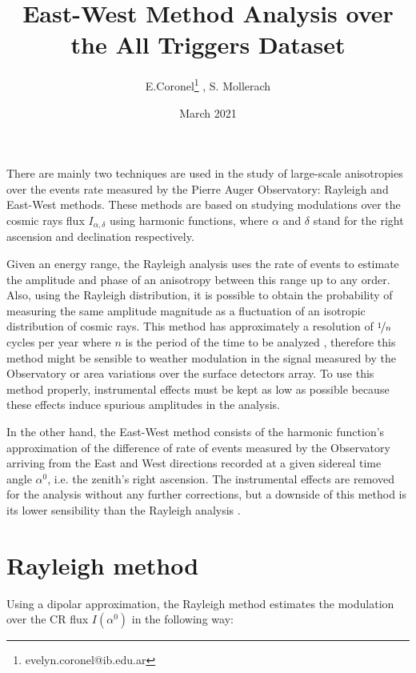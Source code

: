 \documentclass[12pt, doublespace, oneside]{article}
\title{{\vspace{-1.6cm}}East-West Method Analysis over the All Triggers Dataset}
\author{E.Coronel\footnote{evelyn.coronel@ib.edu.ar} ,  S. Mollerach}
\date{March 2021}
\begin{document}
\begin{titlepage}
\maketitle
\end{titlepage}


There are mainly two techniques are used in the study of large-scale anisotropies over the events rate measured by the Pierre Auger Observatory: Rayleigh and East-West methods. These methods are based on studying modulations over the cosmic rays flux $I_{\alpha, \delta}$ using harmonic functions, where $\alpha$ and $\delta$ stand for the right ascension and declination respectively. 

Given an energy range, the Rayleigh analysis uses the rate of events to estimate the amplitude and phase of an anisotropy between this range up to any order. Also, using the Rayleigh distribution, it is possible to obtain the probability of measuring the same amplitude magnitude as a fluctuation of an isotropic distribution of cosmic rays. This method has approximately a resolution of $\nicefrac{1}{n}$ cycles per year where $n$ is the period of the time to be analyzed \cite{resolucion_barrido}, therefore this method might be sensible to weather modulation in the signal measured by the Observatory or area variations over the surface detectors array. To use this method properly,  instrumental effects must be kept as low as possible because these effects induce spurious amplitudes in the analysis.


In the other hand, the East-West method consists of the harmonic function's approximation of the difference of rate of events measured by the Observatory arriving from the East and West directions recorded at a given sidereal time angle $\alpha^0$, i.e. the zenith's right ascension. The instrumental effects are removed for the analysis without any further corrections, but a downside of this method is its lower sensibility than the Rayleigh analysis \cite{taborda}.

\section{Rayleigh method}

Using a dipolar approximation, the Rayleigh method estimates the modulation over the CR flux $I(\alpha^0)$ in the following way:
\end{document}
